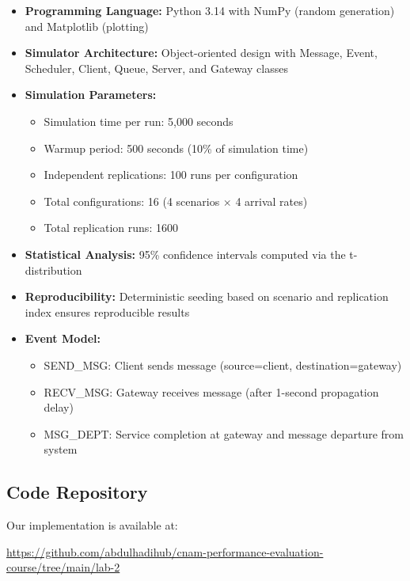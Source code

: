 \documentclass[12pt]{article}
\begin{document}
\begin{itemize}
    \item \textbf{Programming Language:} Python 3.14 with NumPy (random generation) and Matplotlib (plotting)
    \item \textbf{Simulator Architecture:} Object-oriented design with Message, Event, Scheduler, Client, Queue, Server, and Gateway classes
    \item \textbf{Simulation Parameters:}
          \begin{itemize}
              \item Simulation time per run: 5,000 seconds
              \item Warmup period: 500 seconds (10\% of simulation time)
              \item Independent replications: 100 runs per configuration
              \item Total configurations: 16 (4 scenarios $\times$ 4 arrival rates)
              \item Total replication runs: 1600
          \end{itemize}
    \item \textbf{Statistical Analysis:} 95\% confidence intervals computed via the t-distribution
    \item \textbf{Reproducibility:} Deterministic seeding based on scenario and replication index ensures reproducible results
    \item \textbf{Event Model:}
          \begin{itemize}
              \item SEND\_MSG: Client sends message (source=client, destination=gateway)
              \item RECV\_MSG: Gateway receives message (after 1-second propagation delay)
              \item MSG\_DEPT: Service completion at gateway and message departure from system
          \end{itemize}
\end{itemize}

\subsection{Code Repository}

Our implementation is available at:

\begin{center}
    \url{https://github.com/abdulhadihub/cnam-performance-evaluation-course/tree/main/lab-2}
\end{center}
\end{document}
